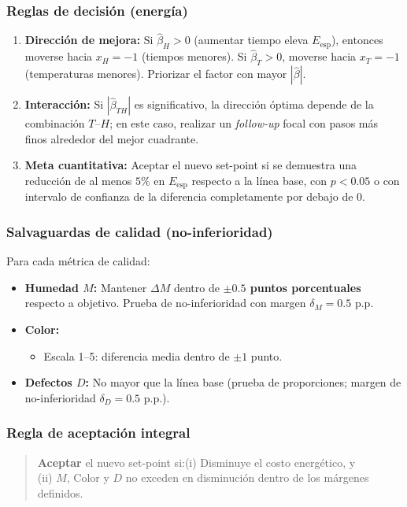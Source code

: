 \subsubsection*{Reglas de decisión (energía)}
\begin{enumerate}[label=\textbf{D\arabic*.}, left=0pt]
  \item \textbf{Dirección de mejora:} Si $\hat{\beta}_H>0$ (aumentar tiempo eleva $E_{\mathrm{esp}}$), entonces moverse hacia $x_H=-1$ (tiempos menores). Si $\hat{\beta}_T>0$, moverse hacia $x_T=-1$ (temperaturas menores). Priorizar el factor con mayor $|\hat{\beta}|$.
  \item \textbf{Interacción:} Si $|\hat{\beta}_{TH}|$ es significativo, la dirección óptima depende de la combinación $T$–$H$; en este caso, realizar un \textit{follow-up} focal con pasos más finos alrededor del mejor cuadrante.
  \item \textbf{Meta cuantitativa:} Aceptar el nuevo set-point si se demuestra una reducción de al menos \textbf{{$5\%$}} en $E_{\mathrm{esp}}$ respecto a la línea base, con $p<0{.}05$ o con intervalo de confianza de la diferencia completamente por debajo de 0.
\end{enumerate}

\subsubsection*{Salvaguardas de calidad (no-inferioridad)}
Para cada métrica de calidad:
\begin{itemize}[left=0pt]
  \item \textbf{Humedad $M$:} Mantener $\Delta M$ dentro de \textbf{$\pm{0{.}5}$ puntos porcentuales} respecto a objetivo. Prueba de no-inferioridad con margen $\delta_M={0{.}5}$ p.p.
  \item \textbf{Color:} 
    \begin{itemize}
      \item Escala 1--5: diferencia media dentro de $\pm{1}$ punto.
    \end{itemize}
  \item \textbf{Defectos $D$:} No mayor que la línea base (prueba de proporciones; margen de no-inferioridad $\delta_D={0{.}5}$ p.p.).
\end{itemize}

\subsubsection*{Regla de aceptación integral}
\begin{quote}
\textbf{Aceptar} el nuevo set-point si:(i) Disminuye el costo energético, y \\(ii) $M$, Color y $D$ no exceden en disminución dentro de los márgenes definidos.
\end{quote}

